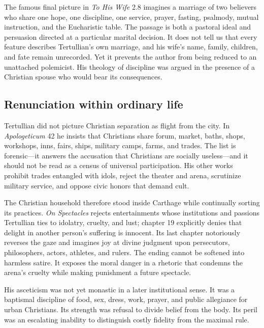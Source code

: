 The famous final picture in \emph{To His Wife} 2.8 imagines a marriage of two
believers who share one hope, one discipline, one service, prayer, fasting,
psalmody, mutual instruction, and the Eucharistic table. The passage is both a
pastoral ideal and persuasion directed at a particular marital decision. It
does not tell us that every feature describes Tertullian's own marriage, and
his wife's name, family, children, and fate remain unrecorded. Yet it prevents
the author from being reduced to an unattached polemicist. His theology of
discipline was argued in the presence of a Christian spouse who would bear its
consequences.

\subsection{Renunciation within ordinary life}

Tertullian did not picture Christian separation as flight from the city. In
\emph{Apologeticum} 42 he insists that Christians share forum, market,
baths, shops, workshops, inns, fairs, ships, military camps, farms, and trades.
The list is forensic---it answers the accusation that Christians are socially
useless---and it should not be read as a census of universal participation.
His other works prohibit trades entangled with idols, reject the theater and
arena, scrutinize military service, and oppose civic honors that demand cult.

The Christian household therefore stood inside Carthage while continually
sorting its practices. \emph{On Spectacles} rejects entertainments whose
institutions and passions Tertullian ties to idolatry, cruelty, and lust; chapter
19 explicitly denies that delight in another person's suffering is innocent.
Its last chapter notoriously reverses the gaze and imagines joy at divine
judgment upon persecutors, philosophers, actors, athletes, and rulers. The
ending cannot be softened into harmless satire. It exposes the moral danger in
a rhetoric that condemns the arena's cruelty while making punishment a future
spectacle.

His asceticism was not yet monastic in a later institutional sense. It was a
baptismal discipline of food, sex, dress, work, prayer, and public allegiance
for urban Christians. Its strength was refusal to divide belief from the body.
Its peril was an escalating inability to distinguish costly fidelity from the
maximal rule.
